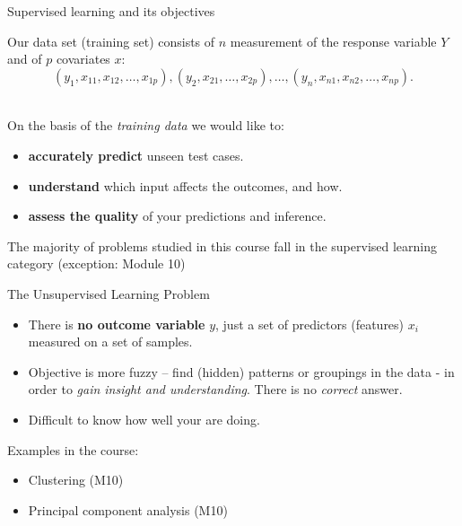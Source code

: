 \documentclass[ignorenonframetext,]{beamer}
\providecommand{\tightlist}{%
  \setlength{\itemsep}{0pt}\setlength{\parskip}{0pt}}
\begin{document}
\begin{frame}

\begin{block}{Supervised learning and its objectives}

\vspace{2mm}

Our data set (training set) consists of \(n\) measurement of the
response variable \(Y\) and of \(p\) covariates \(x\):
\[(y_1, x_{11}, x_{12},\ldots, x_{1p}), (y_2, x_{21},\ldots, x_{2p}), \ldots, (y_n, x_{n1}, x_{n2},\ldots, x_{np}).\]
\(~\)

On the basis of the \emph{training data} we would like to:

\begin{itemize}
\item
  \textbf{accurately predict} unseen test cases.
\item
  \textbf{understand} which input affects the outcomes, and how.
\item
  \textbf{assess the quality} of your predictions and inference.
\end{itemize}

\vspace{2mm}

The majority of problems studied in this course fall in the supervised
learning category (exception: Module 10)

\end{block}

\end{frame}

\begin{frame}{The Unsupervised Learning Problem}

\begin{itemize}
\item
  There is \textbf{no outcome variable} \(y\), just a set of predictors
  (features) \(x_i\) measured on a set of samples.
\item
  Objective is more fuzzy -- find (hidden) patterns or groupings in the
  data - in order to \emph{gain insight and understanding}. There is no
  \emph{correct} answer.
\item
  Difficult to know how well your are doing.
\end{itemize}

Examples in the course:

\begin{itemize}
\tightlist
\item
  Clustering (M10)
\item
  Principal component analysis (M10)
\end{itemize}

\end{frame}
\end{document}
